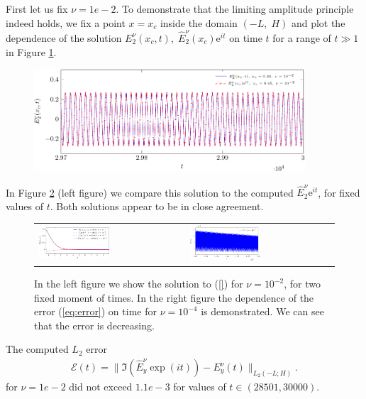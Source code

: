 First let us fix $\nu=1e-2$. 
To demonstrate that the limiting amplitude principle indeed holds, we fix a point $x=x_c$ 
inside the domain $(-L,\; H)$ and plot the dependence of the solution $E_{2}^{\nu}(x_c,t), \; \hat{E}_2^{\nu}(x_c)\mathrm{e}^{it}$ 
on time $t$ for a range of $t\gg 1$ in Figure \ref{fig:nu1e2_harmon}.  

\begin{figure}[htb]
\includegraphics[width=0.9\textwidth]{figure_nu1e2-crop.pdf}
 \label{fig:nu1e2_harmon}
\end{figure}

In Figure \ref{fig:nu1e2_harmon2} (left figure) we compare this solution to the computed $\hat{E}_2^{\nu}\mathrm{e}^{it}$, for
fixed values of $t$. Both solutions appear to be in close agreement. 
\begin{figure}[htb]
 \begin{tabular}{ll}
\includegraphics[width=0.5\textwidth]{figure_nu1e2_2-crop.pdf}
&
\includegraphics[width=0.5\textwidth]{figure_error_nu1e4-crop.pdf}\\
\end{tabular}
\caption{In the left figure we show the solution to (\ref{}) for $\nu=10^{-2}$, for two fixed moment of times. In the right figure 
the dependence of the error (\ref{eq:error}) on time for $\nu=10^{-4}$ is demonstrated. 
We can see that the error is decreasing.}
 \label{fig:nu1e2_harmon2}
\end{figure}
The computed $L_2$ error
\begin{align}
\label{eq:error}
\mathcal{E}(t)=\|\Im\left(\hat{E}_y^{\nu}\exp(it)\right)-E_y^{\nu}(t)\|_{L_{2}(-L;H)}.
\end{align}
for $\nu=1e-2$ did not exceed $1.1e-3$ for values of $t\in \left(28501,  30000\right)$. 

